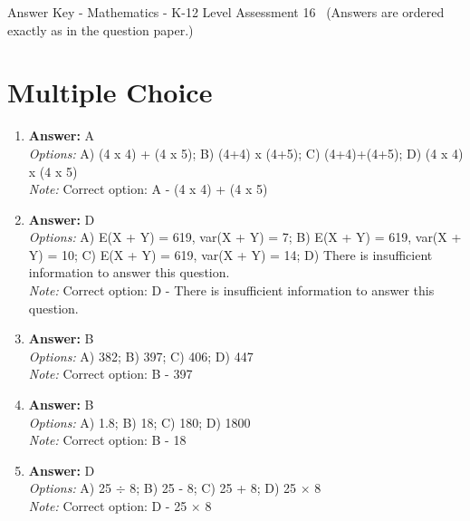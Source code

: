 \documentclass[12pt]{article}
\begin{document}
\begin{center}
Answer Key - Mathematics - K-12 Level Assessment 16 \
\small (Answers are ordered exactly as in the question paper.)
\end{center}

\section*{Multiple Choice}
\begin{enumerate}[label=\arabic*.]
\item \textbf{Answer:} A
\\ \textit{Options:} A) (4 x 4) + (4 x 5); B) (4+4) x (4+5); C) (4+4)+(4+5); D) (4 x 4) x (4 x 5)
\\ \textit{Note:} Correct option: A - (4 x 4) + (4 x 5)
\item \textbf{Answer:} D
\\ \textit{Options:} A) E(X + Y) = 619, var(X + Y) = 7; B) E(X + Y) = 619, var(X + Y) = 10; C) E(X + Y) = 619, var(X + Y) = 14; D) There is insufficient information to answer this question.
\\ \textit{Note:} Correct option: D - There is insufficient information to answer this question.
\item \textbf{Answer:} B
\\ \textit{Options:} A) 382; B) 397; C) 406; D) 447
\\ \textit{Note:} Correct option: B - 397
\item \textbf{Answer:} B
\\ \textit{Options:} A) 1.8; B) 18; C) 180; D) 1800
\\ \textit{Note:} Correct option: B - 18
\item \textbf{Answer:} D
\\ \textit{Options:} A) 25 \ensuremath{\div} 8; B) 25 - 8; C) 25 + 8; D) 25 \ensuremath{\times} 8
\\ \textit{Note:} Correct option: D - 25 \ensuremath{\times} 8
\end{enumerate}
\end{document}
